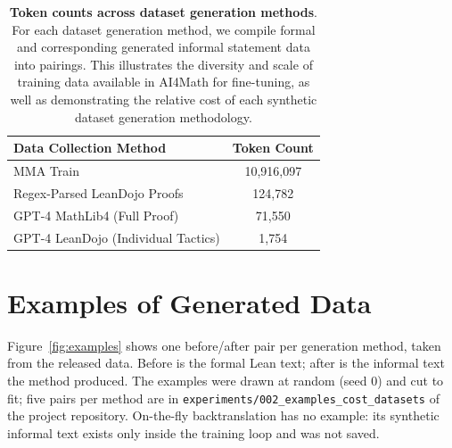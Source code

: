 \documentclass{article} %
\begin{document}
\begin{table}[ht]
\centering
\begin{tabular}{|l|c|}
\hline
\textbf{Data Collection Method} & \textbf{Token Count} \\
\hline
MMA Train &  10,916,097\\
\hline
Regex-Parsed LeanDojo Proofs & 124,782\\
\hline
GPT-4 MathLib4 (Full Proof) & 71,550\\
\hline
GPT-4 LeanDojo (Individual Tactics) & 1,754\\
\hline
\end{tabular}
\caption{\textbf{Token counts across dataset generation methods}. For each dataset generation method, we compile formal and corresponding generated informal statement data into pairings. This illustrates the diversity and scale of training data available in AI4Math for fine-tuning, as well as demonstrating the relative cost of each synthetic dataset generation methodology.}
\label{table:dataset_composition}
\end{table}


\section{Examples of Generated Data}
Figure~\ref{fig:examples} shows one before/after pair per generation method, taken from the released data. Before is the formal Lean text; after is the informal text the method produced. The examples were drawn at random (seed 0) and cut to fit; five pairs per method are in \texttt{experiments/002\_examples\_cost\_datasets} of the project repository. On-the-fly backtranslation has no example: its synthetic informal text exists only inside the training loop and was not saved.
\end{document}
